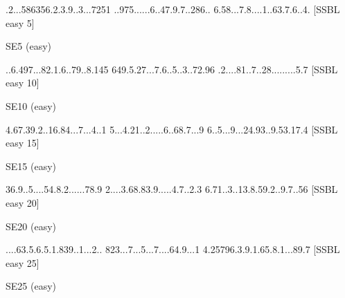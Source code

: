 \documentclass[twoside]{article}
\begin{document}
\cleardoublepage

\cluefont{\LARGE}

\pagestyle{headings}
\begin{multicols}{2}
\renewcommand*{\puzzlefile}{se5.sud}
\writepuzzle%
{.2...5863}{56.2.3.9.}{.3...7251}%
{..975....}{..6..47.9}{.7..286..}%
{6.58...7.}{8....1..6}{3.7.6..4.}%
[SSBL easy 5]
\vfill
\begin{minipage}{0.95\linewidth}\begin{center}
SE5 (easy) \\
\end{center}\end{minipage}

\renewcommand*{\puzzlefile}{se10.sud}
\writepuzzle%
{..6.497..}{.82.1.6..}{79..8.145}%
{649.5.27.}{..7.6..5.}{.3..72.96}%
{.2....81.}{.7..28...}{......5.7}%
[SSBL easy 10]
\vfill
\begin{minipage}{0.95\linewidth}\begin{center}
SE10 (easy) \\
\end{center}\end{minipage}
\end{multicols}
\vspace*{1cm}

\begin{multicols}{2}
\renewcommand*{\puzzlefile}{se15.sud}
\writepuzzle%
{4.67.39.2}{..16.84..}{.7...4..1}%
{5...4.21.}{.2.....6.}{.68.7...9}%
{6..5...9.}{..24.93..}{9.53.17.4}%
[SSBL easy 15]
\vfill
\begin{minipage}{0.95\linewidth}\begin{center}
SE15 (easy) \\
\end{center}\end{minipage}

\renewcommand*{\puzzlefile}{se20.sud}
\writepuzzle%
{36.9..5..}{..54.8.2.}{.....78.9}%
{2....3.68}{.83.9....}{.4.7..2.3}%
{6.71..3..}{13.8.59.2}{..9.7..56}%
[SSBL easy 20]
\vfill
\begin{minipage}{0.95\linewidth}\begin{center}
SE20 (easy) \\
\end{center}\end{minipage}
\end{multicols}
\renewcommand*{\puzzlefile}{se25.sud}
\writepuzzle%
{....63.5.}{6.5.1.839}{..1...2..}%
{823...7..}{.5...7...}{.64.9...1}%
{4.25796.3}{.9.1.65.8}{.1...89.7}%
[SSBL easy 25]
\vfill
\begin{minipage}{0.95\linewidth}\begin{center}
SE25 (easy) \\
\end{center}\end{minipage}
\end{document}
